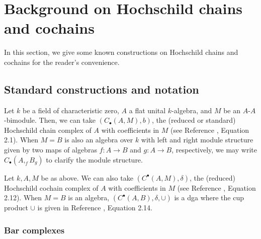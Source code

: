 \chapter{Background on Hochschild chains and cochains}
In this section, we give some known 
constructions on Hochschild chains and 
cochains for the reader's convenience. 
%
\section{Standard constructions and notation}
Let $k$ be a field of characteristic zero, 
$A$ a flat unital $k$-algebra, and $M$ be an 
$A$-$A$-bimodule. Then, we can take 
$(C_\bullet(A,M), b)$, the 
(reduced or standard) Hochschild chain 
complex of $A$ 
with coefficients in $M$ (see Reference 
\cite{T}, Equation 2.1). When $M = B$ is also 
an algebra over $k$ with left and right 
module structure given by two maps of algebras 
$f:A \to B$ and $g:A \to B$, respectively, 
we may write $C_\bullet(A,_fB_g)$ to clarify 
the module structure.

Let $k, A, M$ be as above. We can also 
take $(C^\bullet(A,M), \delta)$, the 
(reduced) Hochschild cochain complex of $A$ 
with coefficients in $M$ (see Reference 
\cite{T}, Equation 2.12). When $M=B$ is 
an algebra, $(C^\bullet(A,B), \delta, \cup)$ 
is a dga where the cup product $\cup$ is 
given in Reference \cite{T}, Equation 2.14.

\subsection{Bar complexes}




